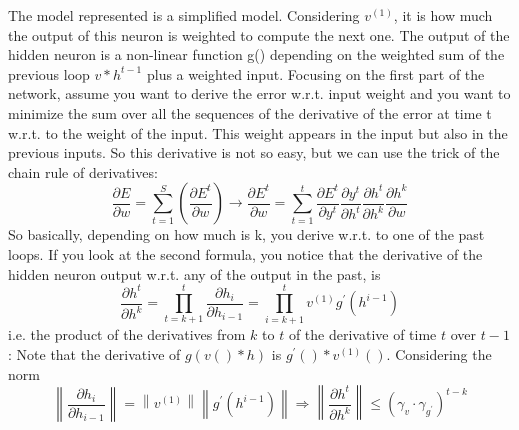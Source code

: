 The model represented is a simplified model. Considering $v^{(1)}$, it is how much the output of this neuron is weighted to compute the next one.  The output of the hidden neuron is a non-linear function g() depending on the weighted sum of the previous loop $v * h^{t-1}$ plus a weighted input. %
Focusing on the first part of the network, assume you want to derive the error w.r.t. input weight %
and you want to minimize the sum over all the sequences of the derivative of the error at time t w.r.t. to the weight of the input. This weight appears in the input but also in the previous inputs. So this derivative is not so easy, but we can use the trick of the chain rule of derivatives: 
$$
\frac{\partial E}{\partial w}=\sum_{t=1}^{S}\left(\frac{\partial E^{t}}{\partial w}\right) \rightarrow {\frac{\partial E^t}{\partial w}} = \sum_{t=1}^{t} \frac{\partial E^t}{\partial y^t} \frac{\partial y^t}{\partial h^t} \frac{\partial h^t}{\partial h^k} \frac{\partial h^k}{\partial w}
$$
So basically, depending on how much is k, you derive w.r.t. to one of the past loops. If you look at the second formula, you notice that the derivative of the hidden neuron output w.r.t. any of the output in the past,  is $$
\frac{\partial h^{t}}{\partial h^{k}}=\prod_{t=k+1}^{t} \frac{\partial h_{i}}{\partial h_{i-1}}=\prod_{i=k+1}^{t} v^{(1)} g^{\prime}\left(h^{i-1}\right)
$$
i.e. the product of the derivatives from $k$ to $t$ of the derivative of time $t$ over $t-1$: 
Note that the derivative of $g(v()*h)$ is $g^{\prime}()* v^{(1)}()$. %
Considering the norm
$$
\left\|\frac{\partial h_{i}}{\partial h_{i-1}}\right\|=\left\|v^{(1)}\right\|\left\|g^{\prime}\left(h^{i-1}\right)\right\| \Rightarrow\left\|\frac{\partial h^{t}}{\partial h^{k}}\right\| \leq\left(\gamma_{v} \cdot \gamma_{g^{\prime}}\right)^{t-k}
$$
